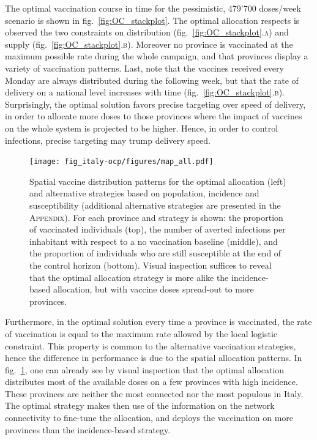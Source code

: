 The optimal vaccination course in time for the pessimistic, 479'700 doses/week scenario is shown in fig.~\ref{fig:OC_stackplot}. The optimal allocation respects is observed the two constraints on distribution (fig.~\ref{fig:OC_stackplot}.\textsc{a}) and supply (fig.~\ref{fig:OC_stackplot}.\textsc{b}). Moreover no province is vaccinated at the maximum possible rate during the whole campaign, and that provinces display a variety of vaccination patterns. Last, note that the vaccines received every Monday are always distributed during the following week, but that the rate of delivery on a national level increases with time (fig.~\ref{fig:OC_stackplot}.\textsc{b}). Surprisingly, the optimal solution favors precise targeting over speed of delivery, in order to allocate more doses to those provinces where the impact of vaccines on the whole system is projected to be higher. Hence, in order to control infections, precise targeting may trump delivery speed. 

\begin{figure}[!ht]
    \centering
    \texttt{[image: fig\_italy-ocp/figures/map\_all.pdf]}
    \caption[Spatial vaccine distribution patterns]{Spatial vaccine distribution patterns for the optimal allocation (left) and alternative strategies based on population, incidence and susceptibility (additional alternative strategies are presented in the \textsc{Appendix}). For each province and strategy is shown: the proportion of vaccinated individuals (top), the number of averted infections per inhabitant with respect to a no vaccination baseline (middle), and the proportion of individuals who are still susceptible at the end of the control horizon (bottom). Visual inspection suffices to reveal that the optimal allocation strategy is more alike the incidence-based allocation, but with vaccine doses spread-out to more provinces.}
    \label{fig:OC_multimap}
\end{figure}

Furthermore, in the optimal solution every time a province is vaccinated, the rate of vaccination is equal to the maximum rate allowed by the local logistic constraint. This property is common to the alternative vaccination strategies, hence the difference in performance is due to the spatial allocation patterns.%
In fig.~\ref{fig:OC_multimap}, one can already see by visual inspection that the optimal allocation distributes most of the available doses on a few provinces with high incidence. These provinces are neither the most connected nor the most populous in Italy. The optimal strategy makes then use of the information on the network connectivity to fine-tune the allocation, and deploys the vaccination on more provinces than the incidence-based strategy. %

